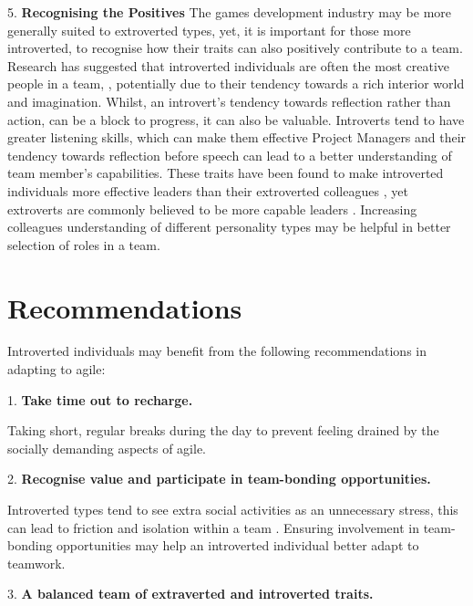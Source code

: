 \documentclass{scrartcl}
\begin{document}
5.	\textbf{Recognising the Positives} \newline
The games development industry may be more generally suited to extroverted types, yet, it is important for those more introverted, to recognise how their traits can also positively contribute to a team. Research has suggested that introverted individuals are often the most creative people in a team, \cite{feist}, potentially due to their tendency towards a rich interior world and imagination. Whilst, an introvert's tendency towards reflection rather than action, can be a block to progress, it can also be valuable. Introverts tend to have greater listening skills, which can make them effective Project Managers and their tendency towards reflection before speech can lead to a better understanding of team member's capabilities. These traits have been found to make introverted individuals more effective leaders than their extroverted colleagues \cite{Morrish}, yet extroverts are commonly believed to be more capable leaders \cite{Cain}. Increasing colleagues understanding of different personality types may be helpful in better selection of roles in a team.

\section{Recommendations}

Introverted individuals may benefit from the following recommendations in adapting to agile:

1. \textbf{Take time out to recharge.}

Taking short, regular breaks during the day to prevent feeling drained by the socially demanding aspects of agile.

2. \textbf{Recognise value and participate in team-bonding opportunities.}
 
Introverted types tend to see extra social activities as an unnecessary stress, this can lead to friction and isolation within a team \cite{WhitworthBiddle}. Ensuring involvement in team-bonding opportunities may help an introverted individual better adapt to teamwork.

3. \textbf{A balanced team of extraverted and introverted traits.}
\end{document}
